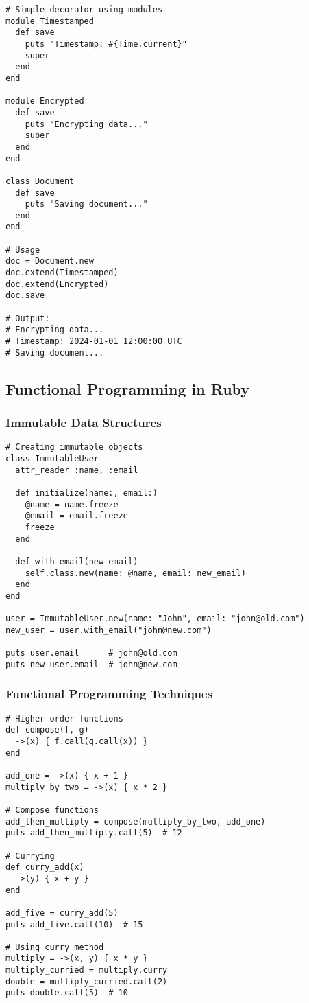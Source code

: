 \documentclass[12pt,a4paper]{article}
\begin{document}
\begin{lstlisting}
# Simple decorator using modules
module Timestamped
  def save
    puts "Timestamp: #{Time.current}"
    super
  end
end

module Encrypted
  def save
    puts "Encrypting data..."
    super
  end
end

class Document
  def save
    puts "Saving document..."
  end
end

# Usage
doc = Document.new
doc.extend(Timestamped)
doc.extend(Encrypted)
doc.save

# Output:
# Encrypting data...
# Timestamp: 2024-01-01 12:00:00 UTC
# Saving document...
\end{lstlisting}

\subsection{Functional Programming in Ruby}

\subsubsection{Immutable Data Structures}

\begin{lstlisting}
# Creating immutable objects
class ImmutableUser
  attr_reader :name, :email
  
  def initialize(name:, email:)
    @name = name.freeze
    @email = email.freeze
    freeze
  end
  
  def with_email(new_email)
    self.class.new(name: @name, email: new_email)
  end
end

user = ImmutableUser.new(name: "John", email: "john@old.com")
new_user = user.with_email("john@new.com")

puts user.email      # john@old.com
puts new_user.email  # john@new.com
\end{lstlisting}

\subsubsection{Functional Programming Techniques}

\begin{lstlisting}
# Higher-order functions
def compose(f, g)
  ->(x) { f.call(g.call(x)) }
end

add_one = ->(x) { x + 1 }
multiply_by_two = ->(x) { x * 2 }

# Compose functions
add_then_multiply = compose(multiply_by_two, add_one)
puts add_then_multiply.call(5)  # 12

# Currying
def curry_add(x)
  ->(y) { x + y }
end

add_five = curry_add(5)
puts add_five.call(10)  # 15

# Using curry method
multiply = ->(x, y) { x * y }
multiply_curried = multiply.curry
double = multiply_curried.call(2)
puts double.call(5)  # 10
\end{lstlisting}
\end{document}
